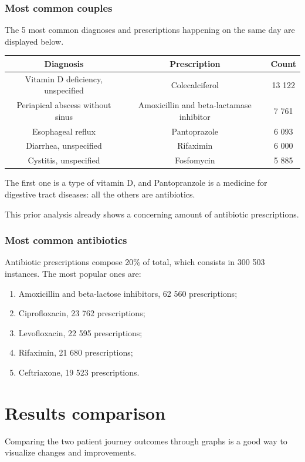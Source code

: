 \subsubsection{Most common couples}
The 5 most common diagnoses and prescriptions happening on the same day are displayed below.
\begin{center}
	\small
	\begin{tabular}{c|c|c}
		Diagnosis & Prescription & Count \\
		\hline
		Vitamin D deficiency, unspecified & Colecalciferol & 13 122 \\
		\hline
		Periapical abscess without sinus & Amoxicillin and beta-lactamase inhibitor & 7 761 \\
		\hline
		Esophageal reflux & Pantoprazole & 6 093 \\
		\hline
		Diarrhea, unspecified & Rifaximin & 6 000 \\
		\hline
		Cystitis, unspecified & Fosfomycin & 5 885 \\
	\end{tabular}
\end{center}
The first one is a type of vitamin D, and Pantopranzole is a medicine for digestive tract diseases: all the others are antibiotics. 

This prior analysis already shows a concerning amount of antibiotic prescriptions. 

\subsubsection{Most common antibiotics}
Antibiotic prescriptions compose 20\% of total, which consists in 300 503 instances. The most popular ones are:
\begin{enumerate}
	\item Amoxicillin and beta-lactose inhibitors, 62 560 prescriptions;
	\item Ciprofloxacin, 23 762 prescriptions;
	\item Levofloxacin, 22 595 prescriptions;
	\item Rifaximin, 21 680 prescriptions;
	\item Ceftriaxone, 19 523 prescriptions.
\end{enumerate}

\section{Results comparison}
Comparing the two patient journey outcomes through graphs is a good way to visualize changes and improvements.

